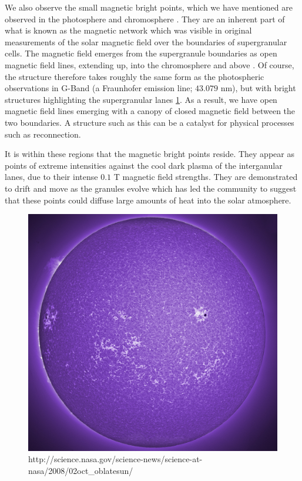 We also observe the small magnetic bright points, which we have mentioned are observed in the photosphere and chromosphere \cite{SanchesAlmeida2010}.
They are an inherent part of what is known as the magnetic network which was visible in original measurements of the solar magnetic field over the boundaries of supergranular cells.
The magnetic field emerges from the supergranule boundaries as open magnetic field lines, extending up, into the chromosphere and above \citep{Hasan2005}.
Of course, the structure therefore takes roughly the same form as the photospheric observations in G-Band (a Fraunhofer emission line; $43.079$ nm), but with bright structures highlighting the supergranular lanes \ref{fig:mag_network}.
As a result, we have open magnetic field lines emerging with a canopy of closed magnetic field between the two boundaries.
A structure such as this can be a catalyst for physical processes such as reconnection.

It is within these regions that the magnetic bright points reside.
They appear as points of extreme intensities against the cool dark plasma of the interganular lanes, due to their intense $0.1$ T magnetic field strengths.
They are demonstrated to drift and move as the granules evolve \citep{Chitta2012} which has led the community to suggest that these points could diffuse large amounts of heat into the solar atmosphere.

\begin{figure}
	\includegraphics{Chapter1/Figs/magnetic_network.png}
	\caption{http://science.nasa.gov/science-news/science-at-nasa/2008/02oct_oblatesun/}
	\label{fig:mag_network}
\end{figure}


